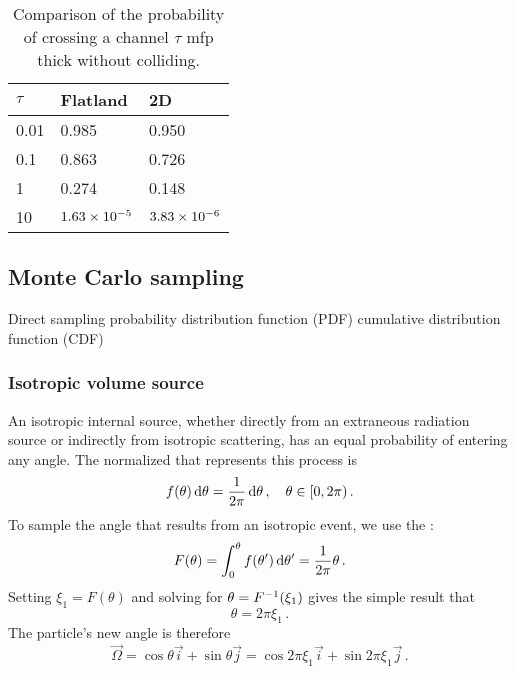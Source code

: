 \begin{table}[htb]
  \centering
  \begin{tabular}{lll}
\toprule
\phantom{10}$\tau$ & Flatland & 2D
\\ \midrule
\phantom{1}0.01 & 0.985 & 0.950 \\
\phantom{1}0.1 & 0.863 & 0.726 \\
\phantom{1}1 & 0.274 & 0.148 \\
10 & $1.63\times 10^{-5}$ & $3.83\times 10^{-6}$
 \\
\bottomrule
  \end{tabular}
  \caption{Comparison of the probability of crossing a channel $\tau$ mfp thick
  without colliding.}
  \label{tab:collision}
\end{table}

\clearpage
\subsection{Monte Carlo sampling}
\cite{Lew1984,Bro2004a}
Direct sampling 
probability distribution function (PDF)
cumulative distribution function (CDF)

\subsubsection{Isotropic volume source}
An isotropic internal source, whether directly from an extraneous radiation
source or indirectly from isotropic scattering, has an equal probability of
entering any angle. The normalized  that
represents this process is
\begin{equation*}
  f(\theta) \mathop{}\!\mathrm{d} \theta = \frac{1}{2\pi} \mathop{}\!\mathrm{d} \theta\,, \quad \theta \in [0, 2\pi)\,.
\end{equation*}
To sample the angle that results from an isotropic event, we use the :
\begin{equation*}
  F(\theta) = \int_{0}^{\theta} f(\theta') \mathop{}\!\mathrm{d} \theta' = \frac{1}{2\pi}
  \theta\,.
\end{equation*}
Setting $\xi_1 = F(\theta)$ and solving for $\theta = F^{-1}(\xi_1)$ gives the
simple result that
\begin{equation*}
  \theta = 2\pi \xi_1\,.
\end{equation*}
The particle's new angle is therefore
\begin{equation*}
  \vec{\Omega} = \cos \theta \vec{i} + \sin \theta \vec{j}
  = \cos 2\pi\xi_1\vec{i} + \sin 2\pi\xi_1 \vec{j}\,.
\end{equation*}

